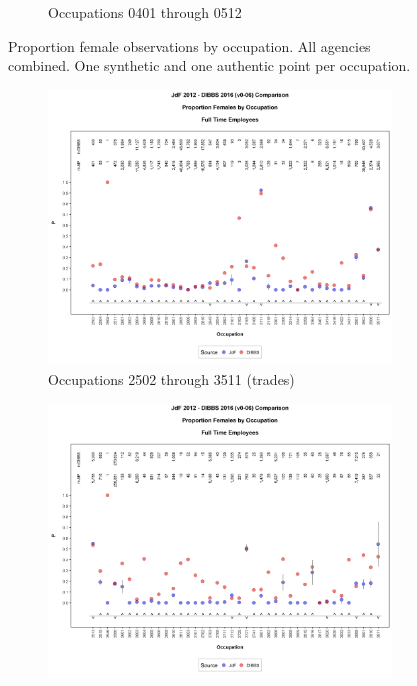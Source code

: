 \documentclass[10pt, letterpaper]{article}
\begin{document}
\begin{spacing}{1.0}
\begin{figure}[h]
\begin{subfigure}{1\textwidth}
        \caption{Occupations 0401 through 0512}
        \vspace{10pt}
    \end{subfigure}
    \caption{Proportion female observations by occupation.  All agencies combined.  One synthetic and one authentic point per occupation.}
    \label{figure:JdFDIBBSOccupationProportionBar2}
\end{figure}

\clearpage

\begin{figure}[h]
    \centering
    \begin{subfigure}{1\textwidth}
        \centering
        \includegraphics[width=6in, trim={0 1in 0 1in}, clip]{JdFDIBBSOccupationProportionBar481.png}
        \caption{Occupations 2502 through 3511 (trades)}
        \vspace{10pt}
    \end{subfigure}
    \begin{subfigure}{1\textwidth}
        \centering
        \includegraphics[width=6in, trim={0 1in 0 1in}, clip]{JdFDIBBSOccupationProportionBar521.png}

\end{subfigure}
\end{figure}
\end{spacing}
\end{document}
